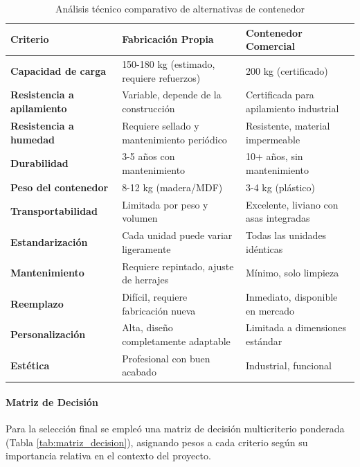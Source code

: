 \begin{table}[H]
\centering
\caption{Análisis técnico comparativo de alternativas de contenedor}
\label{tab:comparativo_tecnico}
\small
\begin{tabular}{|p{4cm}|p{5cm}|p{5cm}|}
\hline
\textbf{Criterio} & \textbf{Fabricación Propia} & \textbf{Contenedor Comercial} \\
\hline
\hline
\textbf{Capacidad de carga} & 150-180 kg (estimado, requiere refuerzos) & 200 kg (certificado) \\
\hline
\textbf{Resistencia a apilamiento} & Variable, depende de la construcción & Certificada para apilamiento industrial \\
\hline
\textbf{Resistencia a humedad} & Requiere sellado y mantenimiento periódico & Resistente, material impermeable \\
\hline
\textbf{Durabilidad} & 3-5 años con mantenimiento & 10+ años, sin mantenimiento \\
\hline
\textbf{Peso del contenedor} & 8-12 kg (madera/MDF) & 3-4 kg (plástico) \\
\hline
\textbf{Transportabilidad} & Limitada por peso y volumen & Excelente, liviano con asas integradas \\
\hline
\textbf{Estandarización} & Cada unidad puede variar ligeramente & Todas las unidades idénticas \\
\hline
\textbf{Mantenimiento} & Requiere repintado, ajuste de herrajes & Mínimo, solo limpieza \\
\hline
\textbf{Reemplazo} & Difícil, requiere fabricación nueva & Inmediato, disponible en mercado \\
\hline
\textbf{Personalización} & Alta, diseño completamente adaptable & Limitada a dimensiones estándar \\
\hline
\textbf{Estética} & Profesional con buen acabado & Industrial, funcional \\
\hline
\end{tabular}
\end{table}

\paragraph{Matriz de Decisión}

Para la selección final se empleó una matriz de decisión multicriterio ponderada (Tabla \ref{tab:matriz_decision}), asignando pesos a cada criterio según su importancia relativa en el contexto del proyecto.

